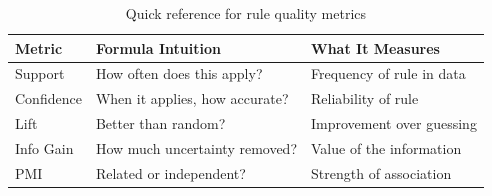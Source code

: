 \documentclass[11pt,a4paper]{article}
\begin{document}
\begin{table}[h]
\centering
\small
\begin{tabular}{@{}llp{6cm}@{}}
\toprule
\textbf{Metric} & \textbf{Formula Intuition} & \textbf{What It Measures} \\
\midrule
Support & How often does this apply? & Frequency of rule in data \\
Confidence & When it applies, how accurate? & Reliability of rule \\
Lift & Better than random? & Improvement over guessing \\
Info Gain & How much uncertainty removed? & Value of the information \\
PMI & Related or independent? & Strength of association \\
\bottomrule
\end{tabular}
\caption{Quick reference for rule quality metrics}
\end{table}
\end{document}
